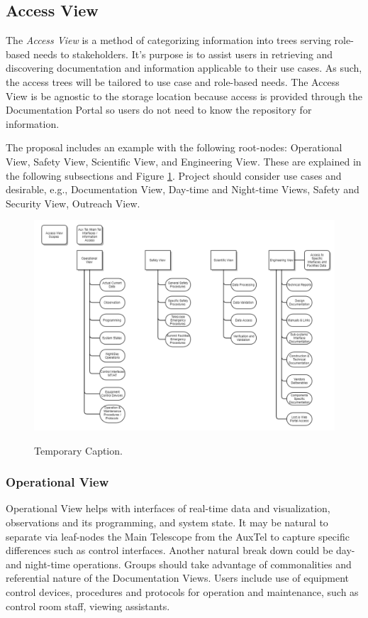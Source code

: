 \subsection{Access View}
\label{sec:access-view}

The \emph{Access View} is a method of categorizing information into trees serving role-based needs to stakeholders.
It's purpose is to assist users in retrieving and discovering documentation and information applicable to their use cases.
As such, the access trees will be tailored to use case and role-based needs.
The Access View is be agnostic to the storage location because access is provided through the Documentation Portal so users do not need to know the repository for information.

The proposal includes an example with the following root-nodes: Operational View, Safety View, Scientific View, and Engineering View.
These are explained in the following subsections and Figure \ref{fig:access-view-example}.
Project should consider use cases and desirable, e.g., Documentation View, Day-time and Night-time Views, Safety and Security View, Outreach View.

\begin{figure}[ht]
\caption{Temporary Caption.}
\centering
\includegraphics[width=\textwidth]{access-view-example-temp}
\label{fig:access-view-example}
\end{figure}

\subsubsection{Operational View}

Operational View helps with interfaces of real-time data and visualization, observations and its programming, and system state.
It may be natural to separate via leaf-nodes the Main Telescope from the AuxTel to capture specific differences such as control interfaces.
Another natural break down could be day- and night-time operations.
Groups should take advantage of commonalities and referential nature of the Documentation Views.
Users include use of equipment control devices, procedures and protocols for operation and maintenance, such as control room staff, viewing assistants.

